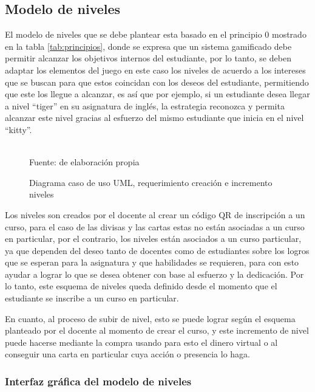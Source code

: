 \subsection{Modelo de niveles}

El modelo de niveles que se debe plantear esta basado en el principio 0 mostrado en la tabla 
\ref{tab:principios}, donde se expresa que un sistema gamificado debe permitir alcanzar los objetivos internos 
del estudiante, por lo tanto, se deben adaptar los elementos del juego en este caso los niveles de acuerdo a 
los intereses que se buscan para que estos coincidan con los deseos del estudiante, permitiendo que este los 
llegue a alcanzar, es así que por ejemplo, si un estudiante desea llegar a nivel ``tiger'' en su asignatura de 
inglés, la estrategia reconozca y permita alcanzar este nivel gracias al esfuerzo del mismo estudiante que 
inicia en el nivel ``kitty''.

\begin{figure}[!htb]
\caption{Diagrama caso de uso UML, requerimiento creación e incremento niveles}
\label{img:UMLcreacioncartas}
\centering
\begin{adjustbox}{width=15cm}
	
\end{adjustbox}
\\
{\footnotesize Fuente: de elaboración propia}
\end{figure}

Los niveles son creados por el docente al crear un código QR de inscripción a un curso, para el caso de las 
divisas y las cartas estas no están asociadas a un curso en particular, por el contrario, los niveles están 
asociados a un curso particular, ya que dependen del deseo tanto de docentes como de estudiantes sobre los 
logros que se esperan para la asignatura y que habilidades se requieren, para con esto ayudar a lograr lo que 
se desea obtener con base al esfuerzo y la dedicación. Por lo tanto, este esquema de niveles queda definido 
desde el momento que el estudiante se inscribe a un curso en particular.

En cuanto, al proceso de subir de nivel, esto se puede lograr según el esquema planteado por el docente al 
momento de crear el curso, y este incremento de nivel puede hacerse mediante la compra usando para esto el 
dinero virtual o al conseguir una carta en particular cuya acción o presencia lo haga.

\subsubsection{Interfaz gráfica del modelo de niveles}

